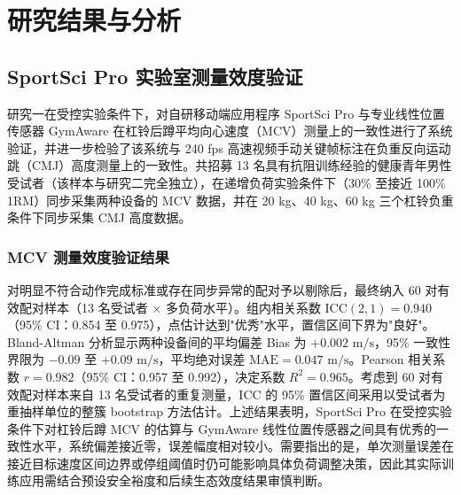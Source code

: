 \documentclass[UTF8,zihao=-4,twoside,openany]{ctexbook}
\begin{document}
\clearpage
\chapter{研究结果与分析}

\section{SportSci Pro 实验室测量效度验证}
研究一在受控实验条件下，对自研移动端应用程序 SportSci Pro 与专业线性位置传感器 GymAware 在杠铃后蹲平均向心速度（MCV）测量上的一致性进行了系统验证，并进一步检验了该系统与 240 fps 高速视频手动关键帧标注在负重反向运动跳（CMJ）高度测量上的一致性。共招募 13 名具有抗阻训练经验的健康青年男性受试者（该样本与研究二完全独立），在递增负荷实验条件下（30\% 至接近 100\% 1RM）同步采集两种设备的 MCV 数据，并在 20 kg、40 kg、60 kg 三个杠铃负重条件下同步采集 CMJ 高度数据。

\subsection{MCV 测量效度验证结果}
对明显不符合动作完成标准或存在同步异常的配对予以剔除后，最终纳入 60 对有效配对样本（13 名受试者 $\times$ 多负荷水平）。组内相关系数 $\text{ICC}(2,1) = 0.940$（95\% CI：0.854 至 0.975），点估计达到"优秀"水平，置信区间下界为"良好"。Bland-Altman 分析显示两种设备间的平均偏差 Bias 为 $+0.002\text{ m/s}$，95\% 一致性界限为 $-0.09$ 至 $+0.09\text{ m/s}$，平均绝对误差 $\text{MAE} = 0.047\text{ m/s}$。Pearson 相关系数 $r = 0.982$（95\% CI：0.957 至 0.992），决定系数 $R^2 = 0.965$。考虑到 60 对有效配对样本来自 13 名受试者的重复测量，ICC 的 95\% 置信区间采用以受试者为重抽样单位的整簇 bootstrap 方法估计。上述结果表明，SportSci Pro 在受控实验条件下对杠铃后蹲 MCV 的估算与 GymAware 线性位置传感器之间具有优秀的一致性水平，系统偏差接近零，误差幅度相对较小。需要指出的是，单次测量误差在接近目标速度区间边界或停组阈值时仍可能影响具体负荷调整决策，因此其实际训练应用需结合预设安全裕度和后续生态效度结果审慎判断。
\end{document}
